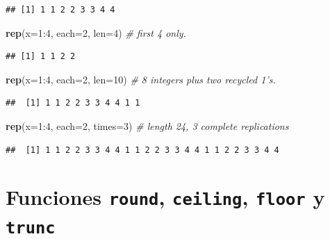 \documentclass[10pt,]{krantz}
\makeatletter
\newenvironment{Shaded}{\begin{snugshade}}{\end{snugshade}}
\newcommand{\KeywordTok}[1]{\textcolor[rgb]{0.13,0.29,0.53}{\textbf{{#1}}}}
\newcommand{\DataTypeTok}[1]{\textcolor[rgb]{0.13,0.29,0.53}{{#1}}}
\newcommand{\DecValTok}[1]{\textcolor[rgb]{0.00,0.00,0.81}{{#1}}}
\newcommand{\CommentTok}[1]{\textcolor[rgb]{0.56,0.35,0.01}{\textit{{#1}}}}
\newcommand{\NormalTok}[1]{{#1}}
\newenvironment{kframe}{%
\medskip{}
\setlength{\fboxsep}{.8em}
 \def\at@end@of@kframe{}%
 \ifinner\ifhmode%
  \def\at@end@of@kframe{\end{minipage}}%
  \begin{minipage}{\columnwidth}%
 \fi\fi%
 \def\FrameCommand##1{\hskip\@totalleftmargin \hskip-\fboxsep
 \colorbox{shadecolor}{##1}\hskip-\fboxsep
     \hskip-\linewidth \hskip-\@totalleftmargin \hskip\columnwidth}%
 \MakeFramed {\advance\hsize-\width
   \@totalleftmargin\z@ \linewidth\hsize
   \@setminipage}}%
 {\par\unskip\endMakeFramed%
 \at@end@of@kframe}
\renewenvironment{Shaded}{\begin{kframe}}{\end{kframe}}
\makeatother
\begin{document}
\begin{verbatim}
## [1] 1 1 2 2 3 3 4 4
\end{verbatim}

\begin{Shaded}
\begin{Highlighting}[]
\KeywordTok{rep}\NormalTok{(}\DataTypeTok{x=}\DecValTok{1}\NormalTok{:}\DecValTok{4}\NormalTok{, }\DataTypeTok{each=}\DecValTok{2}\NormalTok{, }\DataTypeTok{len=}\DecValTok{4}\NormalTok{)    }\CommentTok{# first 4 only.}
\end{Highlighting}
\end{Shaded}

\begin{verbatim}
## [1] 1 1 2 2
\end{verbatim}

\begin{Shaded}
\begin{Highlighting}[]
\KeywordTok{rep}\NormalTok{(}\DataTypeTok{x=}\DecValTok{1}\NormalTok{:}\DecValTok{4}\NormalTok{, }\DataTypeTok{each=}\DecValTok{2}\NormalTok{, }\DataTypeTok{len=}\DecValTok{10}\NormalTok{)   }\CommentTok{# 8 integers plus two recycled 1's.}
\end{Highlighting}
\end{Shaded}

\begin{verbatim}
##  [1] 1 1 2 2 3 3 4 4 1 1
\end{verbatim}

\begin{Shaded}
\begin{Highlighting}[]
\KeywordTok{rep}\NormalTok{(}\DataTypeTok{x=}\DecValTok{1}\NormalTok{:}\DecValTok{4}\NormalTok{, }\DataTypeTok{each=}\DecValTok{2}\NormalTok{, }\DataTypeTok{times=}\DecValTok{3}\NormalTok{)  }\CommentTok{# length 24, 3 complete replications}
\end{Highlighting}
\end{Shaded}

\begin{verbatim}
##  [1] 1 1 2 2 3 3 4 4 1 1 2 2 3 3 4 4 1 1 2 2 3 3 4 4
\end{verbatim}

\section{\texorpdfstring{Funciones \texttt{round}, \texttt{ceiling},
\texttt{floor} y \texttt{trunc}  
}{Funciones round, ceiling, floor y trunc    }}\label{funciones-round-ceiling-floor-y-trunc}
\end{document}
